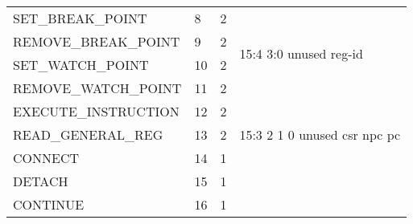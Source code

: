 \begin{longtable}{m{5.7cm} |m{0.9cm} |m{1cm} |m{6.9cm}}
				
				SET\_BREAK\_POINT  & 8 & 2 &
				\multirow{4}{*}{ \begin{minipage}{6.9cm}
						15:4 \hspace*{0.55cm} 3:0
						\newline
						unused \hspace*{0.1cm} reg-id
					\end{minipage}}
					\\ \cline{1-3}	
					REMOVE\_BREAK\_POINT  & 9 & 2 &	\\
					\cline{1-3}	
					SET\_WATCH\_POINT  & 10 & 2 &\\
					\cline{1-3}	
					REMOVE\_WATCH\_POINT  & 11 & 2 &\\
					\hline
					
					EXECUTE\_INSTRUCTION & 12 & 2 &\\
					\hline
					READ\_GENERAL\_REG  & 13 & 2 &
					15:3 \hspace*{0.6cm} 2 \hspace{0.55cm} 1 \hspace{0.55cm} 0
					\newline
					unused \hspace*{0.08cm} csr \hspace{0.25cm} npc \hspace{0.16cm} pc 
					\\
					\hline
					CONNECT  & 14 & 1 &\\
					\hline
					DETACH  & 15 & 1 &\\
					\hline
					CONTINUE  & 16 & 1 &\\
					\hline
\end{longtable}